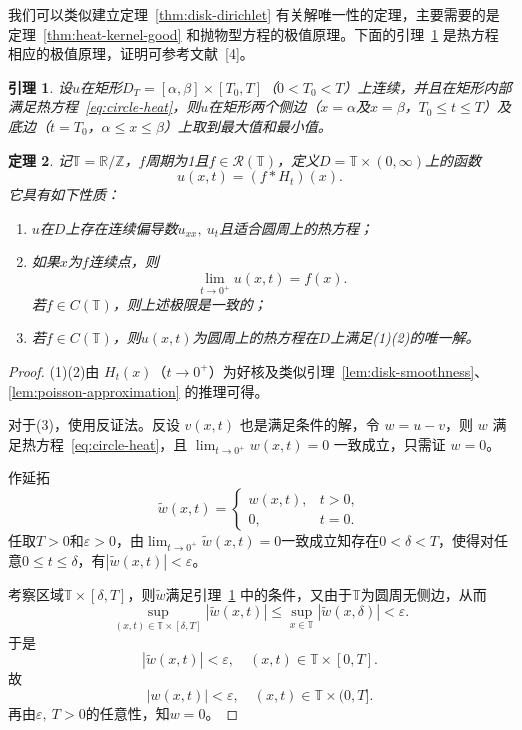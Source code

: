 \documentclass[UTF8,zihao=5,linespread=1.34]{ctexart}
\theoremstyle{cnplain}
\newtheorem{theorem}{定理}[section]
\newtheorem{lemma}[theorem]{引理}
\theoremstyle{cnremark}
\begin{document}
我们可以类似建立定理~\ref{thm:disk-dirichlet} 有关解唯一性的定理，主要需要的是定理~\ref{thm:heat-kernel-good} 和抛物型方程的极值原理。下面的引理~\ref{lem:parabolic-maximum} 是热方程相应的极值原理，证明可参考文献~[4]。

\begin{lemma}\label{lem:parabolic-maximum}
设$u$在矩形$D_T = [\alpha,\beta] \times [T_0,T]$（$0<T_0<T$）上连续，并且在矩形内部满足热方程~\eqref{eq:circle-heat}，则$u$在矩形两个侧边（$x = \alpha$及$x = \beta$，$T_0 \leq t \leq T$）及底边（$t = T_0$，$\alpha \leq x \leq \beta$）上取到最大值和最小值。
\end{lemma}

\begin{theorem}\label{thm:circle-heat}
记$\mathbb{T} = \mathbb{R}/\mathbb{Z}$，$f$周期为1且$f \in \mathcal{R}(\mathbb{T})$，定义$D = \mathbb{T} \times (0,\infty)$上的函数
\[
u(x,t) = (f * H_t)(x).
\]
它具有如下性质：
\begin{enumerate}
\item $u$在$D$上存在连续偏导数$u_{xx},\ u_t$且适合圆周上的热方程；
\item 如果$x$为$f$连续点，则
\[
\lim_{t \rightarrow 0^{+}} u(x,t) = f(x).
\]
若$f \in C(\mathbb{T})$，则上述极限是一致的；
\item 若$f \in C(\mathbb{T})$，则$u(x,t)$为圆周上的热方程在$D$上满足(1)(2)的唯一解。
\end{enumerate}
\end{theorem}

\begin{proof}
(1)(2)由 $H_{t}(x)$（$t \rightarrow 0^{+}$）为好核及类似引理~\ref{lem:disk-smoothness}、\ref{lem:poisson-approximation} 的推理可得。

对于(3)，使用反证法。反设 $v(x,t)$ 也是满足条件的解，令 $w=u-v$，则 $w$ 满足热方程~\eqref{eq:circle-heat}，且 $\lim_{t\rightarrow0^{+}}w(x,t)=0$ 一致成立，只需证 $w=0$。

作延拓
\[
\widetilde{w}(x,t) = 
\begin{cases}
w(x,t), & t > 0, \\
0, & t = 0.
\end{cases}
\]
任取$T > 0$和$\varepsilon > 0$，由$\lim_{t \rightarrow 0^{+}} \widetilde{w}(x,t) = 0$一致成立知存在$0 < \delta < T$，使得对任意$0 \leq t \leq \delta$，有$|\widetilde{w}(x,t)| < \varepsilon$。

考察区域$\mathbb{T} \times [\delta,T]$，则$\widetilde{w}$满足引理~\ref{lem:parabolic-maximum} 中的条件，又由于$\mathbb{T}$为圆周无侧边，从而
\[
\sup_{(x,t) \in \mathbb{T} \times [\delta,T]} |\widetilde{w}(x,t)| \leq \sup_{x \in \mathbb{T}} |\widetilde{w}(x,\delta)| < \varepsilon.
\]
于是
\[
|\widetilde{w}(x,t)| < \varepsilon,\quad (x,t) \in \mathbb{T} \times [0,T].
\]
故
\[
|w(x,t)| < \varepsilon,\quad (x,t) \in \mathbb{T} \times (0,T].
\]
再由$\varepsilon,\ T > 0$的任意性，知$w = 0$。
\end{proof}
\end{document}
